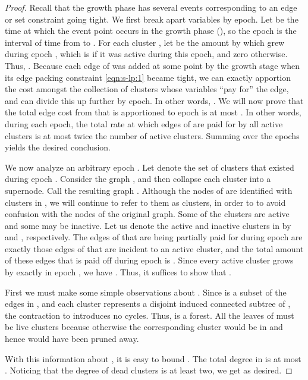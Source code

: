 \begin{proof}
Recall that the growth phase has several events corresponding to an edge or set constraint going tight.
We first break apart  variables by epoch.  Let  be the
  time at which the  event point occurs in the growth phase (), so the  epoch is the interval of time from  to .  For each cluster , let   be the amount by which  grew during epoch , which is   if it was active during this epoch, and zero otherwise.  Thus, .
Because each edge  of 
  was added at some point by the growth stage when its edge packing constraint \eqref{eqn:s-lp:1} became tight, we can exactly apportion the cost
   amongst the collection of clusters  whose
  variables ``pay for'' the edge, and can divide this up further
  by epoch.  In other words, .  We will now prove that the total edge cost from 
  that is apportioned to epoch  is at most .  In other words, during each epoch,
  the total rate at which edges of  are paid for by all active
  clusters is at most twice the number of active clusters.
  Summing over the epochs yields the desired conclusion.

  We now analyze an arbitrary epoch .  Let  denote the set
  of clusters that existed during epoch .
Consider the graph , and then collapse each cluster
   into a supernode.  Call the resulting graph .
Although the nodes of
   are identified with clusters in , we will continue to refer
  to them as clusters, in order to to avoid confusion with the nodes of
  the original graph.  Some of the clusters are active and some may be
  inactive.  Let us denote the active and inactive clusters in 
  by  and , respectively.
  The edges of  that are being partially paid for during epoch 
  are exactly those edges of  that are incident to an active cluster,
  and the total amount of these edges that is paid off during epoch
   is .
  Since every active cluster grows by exactly  in epoch
  , we have . Thus, it suffices to show that .





First we
  must make some simple observations about .  Since  is a subset of the edges in , and each cluster represents a
  disjoint induced connected subtree of , the contraction to  introduces  no cycles.  Thus,  is a forest.
  All the leaves of  must
  be live clusters because otherwise the corresponding cluster  would be
  in  and  hence would have been pruned away.


  With this information about , it is easy to bound .
  The total degree in  is at most .
  Noticing that the degree of dead clusters is at least two,
  we get  as desired.
\end{proof}


